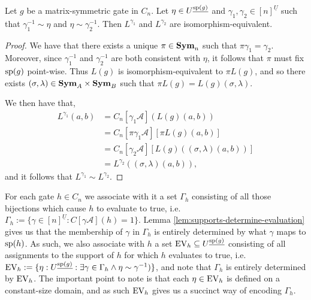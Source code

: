 \documentclass[../paper.tex]{subfiles}
\begin{document}
\begin{lem}
	Let $g$ be a matrix-symmetric gate in $C_n$. Let $\eta \in
	U^{\underline{\text{sp}(g)}}$ and $\gamma_1, \gamma_2 \in [n]^{\underline{U}}$
	such that $\gamma^{-1}_1 \sim \eta$ and $\eta \sim \gamma^{-1}_2$. Then
	$L^{\gamma_1}$ and $L^{\gamma_2}$ are isomorphism-equivalent.
	\label{lem:support-determines-evaluation}
\end{lem}

\begin{proof}
	We have that there exists a unique $\pi \in \text{\textbf{Sym}}_n$ such that $\pi \gamma_1 =
	\gamma_2$. Moreover, since $\gamma^{-1}_1$ and $\gamma^{-1}_2$ are both
	consistent with $\eta$, it follows that $\pi$ must fix $\text{sp}(g)$ point-wise.
	Thus $L(g)$ is isomorphism-equivalent to $\pi L(g)$, and so there exists
	$(\sigma, \lambda) \in \text{\textbf{Sym}}_A \times \text{\textbf{Sym}}_B$ such that $\pi L(g) = L(g)
	(\sigma, \lambda)$.
		
	We then have that,
	\begin{align*}
		L^{\gamma_1} (a,b) & = C_n[\gamma_1 \mathcal{A}](L(g)(a,b))                    \\
		                   & = C_n[\pi \gamma_1 \mathcal{A}][\pi L(g)(a,b)]            \\
		                   & = C_n[\gamma_2 \mathcal{A}][L(g)((\sigma, \lambda)(a,b))] \\
		                   & = L^{\gamma_2} ((\sigma, \lambda) (a,b)),                 
	\end{align*}
	and it follows that $L^{\gamma_1} \sim L^{\gamma_2}$.
\end{proof}

For each gate $h \in C_n$ we associate with it a set $\Gamma_h$ consisting of
all those bijections which cause $h$ to evaluate to true, i.e. $\Gamma_h:=
\{\gamma \in [n]^{\underline{U}} : C[\gamma \mathcal{A}](h) = 1 \}$. Lemma
\ref{lem:supports-determine-evaluation} gives us that the membership of $\gamma$
in $\Gamma_h$ is entirely determined by what $\gamma$ maps to $\text{sp}(h)$. As
such, we also associate with $h$ a set $\text{EV}_h \subseteq
U^{\underline{\text{sp}(g)}}$ consisting of all assignments to the support of $h$
for which $h$ evaluates to true, i.e. $\text{EV}_h := \{ \eta:
U^{\underline{\text{sp}(g)}} : \exists \gamma \in \Gamma_h \wedge \eta \sim
\gamma^{-1})\}$, and note that $\Gamma_h$ is entirely determined by $\text{EV}_h$. The
important point to note is that each $\eta \in \text{EV}_h$ is defined on a
constant-size domain, and as such $\text{EV}_h$ gives us a succinct way of encoding
$\Gamma_h$.
\end{document}
